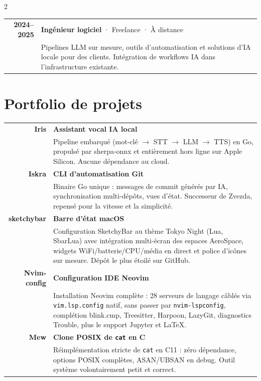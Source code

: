 \documentclass[lighthipster]{simplehipstercv}
\begin{document}
\begin{paracol}{2}
\begin{tabular}{r| p{}}
    \textbf{2024--2025} & \textbf{Ingénieur logiciel} · \textcolor{cvgreen}{Freelance} · À distance \\
    & {\footnotesize Pipelines LLM sur mesure, outils d'automatisation et solutions d'IA locale pour des clients. Intégration de workflows IA dans l'infrastructure existante.} \\
\end{tabular}

\vspace{0.9em}

\section*{Portfolio de projets}

\begin{tabular}{r| p{}}
    \textbf{Iris} & \textbf{Assistant vocal IA local} \\
    & {\footnotesize Pipeline embarqué (mot-clé $\to$ STT $\to$ LLM $\to$ TTS) en Go, propulsé par sherpa-onnx et entièrement hors ligne sur Apple Silicon. Aucune dépendance au cloud.} \\[0.8em]

    \textbf{Iskra} & \textbf{CLI d'automatisation Git} \\
    & {\footnotesize Binaire Go unique : messages de commit générés par IA, synchronisation multi-dépôts, vues d'état. Successeur de Zvezda, repensé pour la vitesse et la simplicité.} \\[0.8em]

    \textbf{sketchybar} & \textbf{Barre d'état macOS} \\
    & {\footnotesize Configuration SketchyBar au thème Tokyo Night (Lua, SbarLua) avec intégration multi-écran des espaces AeroSpace, widgets WiFi/batterie/CPU/média en direct et police d'icônes sur mesure. Dépôt le plus étoilé sur GitHub.} \\[0.8em]

    \textbf{Nvim-config} & \textbf{Configuration IDE Neovim} \\
    & {\footnotesize Installation Neovim complète : 28 serveurs de langage câblés via \texttt{vim.lsp.config} natif, sans passer par \texttt{nvim-lspconfig}, complétion blink.cmp, Treesitter, Harpoon, LazyGit, diagnostics Trouble, plus le support Jupyter et LaTeX.} \\[0.8em]

    \textbf{Mew} & \textbf{Clone POSIX de \texttt{cat} en C} \\
    & {\footnotesize Réimplémentation stricte de \texttt{cat} en C11 : zéro dépendance, options POSIX complètes, ASAN/UBSAN en debug. Outil système volontairement petit et correct.} \\
\end{tabular}


\end{paracol}
\end{document}
